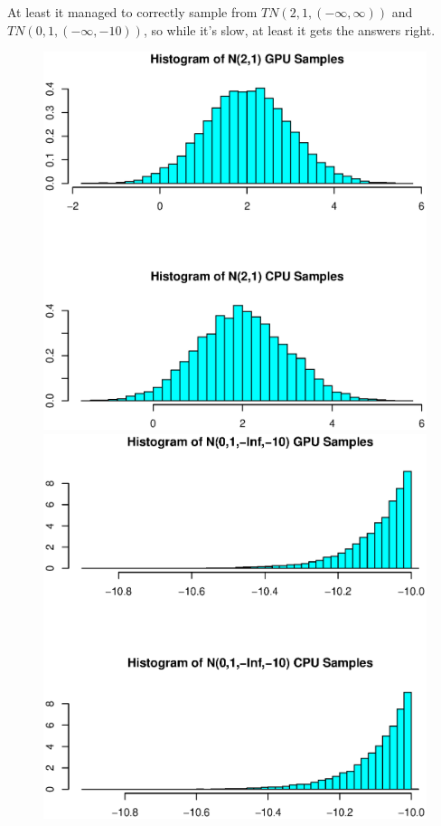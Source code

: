 \documentclass[12pt]{article}
\begin{document}
At least it managed to correctly sample from $TN(2,1,(-\infty, \infty))$ and $TN(0, 1, (-\infty, -10))$, so while it's slow, at least it gets the answers right.
\begin{figure}[H] \center
\includegraphics[scale=.45]{TruncNorm/No_TruncNorm_Hist}
\includegraphics[scale=.45]{TruncNorm/Tail_TruncNorm_Hist}
\end{figure}
\end{document}
